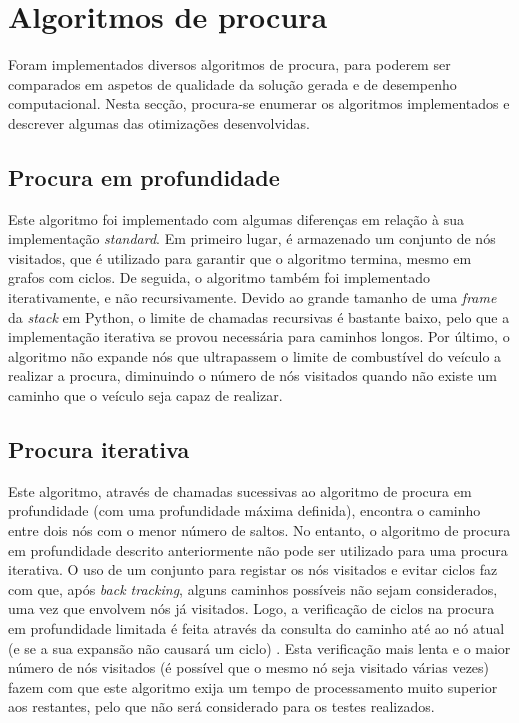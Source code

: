 \documentclass[12pt, a4paper]{article}
\begin{document}
\section{Algoritmos de procura}

Foram implementados diversos algoritmos de procura, para poderem ser comparados em aspetos de
qualidade da solução gerada e de desempenho computacional. Nesta secção, procura-se enumerar os
algoritmos implementados e descrever algumas das otimizações desenvolvidas.

\subsection{Procura em profundidade}

Este algoritmo foi implementado com algumas diferenças em relação à sua implementação
\emph{standard}. Em primeiro lugar, é armazenado um conjunto de nós visitados, que é utilizado para
garantir que o algoritmo termina, mesmo em grafos com ciclos. De seguida, o algoritmo também foi
implementado iterativamente, e não recursivamente. Devido ao grande tamanho de uma \emph{frame} da
\emph{stack} em Python, o limite de chamadas recursivas é bastante baixo, pelo que a implementação
iterativa se provou necessária para caminhos longos. Por último, o algoritmo não expande nós que
ultrapassem o limite de combustível do veículo a realizar a procura, diminuindo o número de nós
visitados quando não existe um caminho que o veículo seja capaz de realizar.

\subsection{Procura iterativa}

Este algoritmo, através de chamadas sucessivas ao algoritmo de procura em profundidade (com uma
profundidade máxima definida), encontra o caminho entre dois nós com o menor número de saltos. No
entanto, o algoritmo de procura em profundidade descrito anteriormente não pode ser utilizado para
uma procura iterativa. O uso de um conjunto para registar os nós visitados e evitar ciclos faz com
que, após \emph{back tracking}, alguns caminhos possíveis não sejam considerados, uma vez que
envolvem nós já visitados. Logo, a verificação de ciclos na procura em profundidade limitada é feita
através da consulta do caminho até ao nó atual (e se a sua expansão não causará um ciclo)
\cite{aima}. Esta verificação mais lenta e o maior número de nós visitados (é possível que o mesmo
nó seja visitado várias vezes) fazem com que este algoritmo exija um tempo de processamento muito
superior aos restantes, pelo que não será considerado para os testes realizados.
\end{document}
